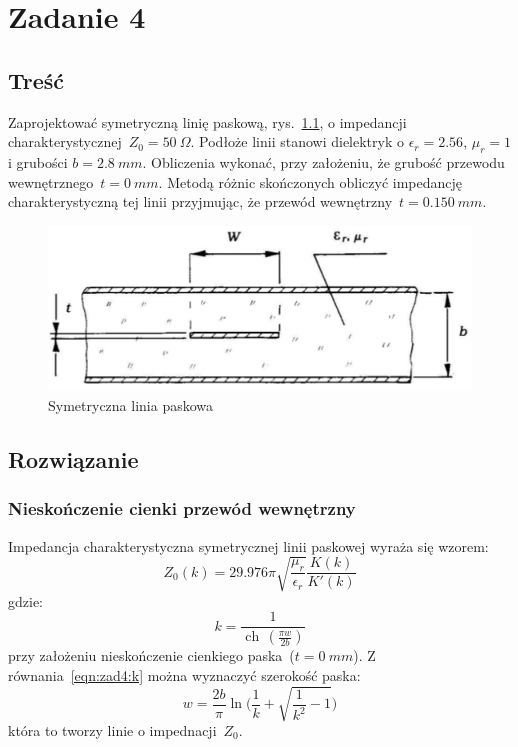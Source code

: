 \documentclass[rep.tex]{subfiles}
\begin{document}
\chapter{Zadanie 4}
\label{zad4}
\section{Treść}
Zaprojektować symetryczną linię paskową, rys.~\ref{fig:zad4:stripline},
o impedancji charakterystycznej~$Z_0 = 50~\Omega$.
Podłoże linii stanowi dielektryk o $\epsilon_r = 2.56$, $\mu_r = 1$ i grubości $b = 2.8~mm$.
Obliczenia wykonać, przy założeniu, że grubość przewodu wewnętrznego~$t = 0~mm$.
Metodą różnic skończonych obliczyć impedancję charakterystyczną tej linii przyjmując,
że przewód wewnętrzny~$t = 0.150~mm$.

\begin{figure}[!htbp]
  \centering
  \includegraphics[scale=0.5]{fig/zad4/stripline}
  \caption{Symetryczna linia paskowa}
  \label{fig:zad4:stripline}
\end{figure}

\section{Rozwiązanie}
\subsection{Nieskończenie cienki przewód wewnętrzny}
Impedancja charakterystyczna symetrycznej linii paskowej wyraża się wzorem:
\begin{equation}
  Z_0(k) = 29.976 \pi \sqrt{\frac{\mu_r}{\epsilon_r}} \frac{K(k)}{K'(k)} \label{eqn:zad4:z}
\end{equation}
gdzie:
\begin{equation}
  k = \frac{1}{\operatorname{ch}\,(\frac{\pi w}{2b})} \label{eqn:zad4:k}
\end{equation}
przy założeniu nieskończenie cienkiego paska~($t = 0~mm$).
Z równania~\ref{eqn:zad4:k} można wyznaczyć szerokość paska:
\begin{equation}
  w = \frac{2b}{\pi} \ln\big(\frac{1}{k} + \sqrt{\frac{1}{k^2} - 1}\big) \label{eqn:zad4:w}
\end{equation}
która to tworzy linie o impednacji~$Z_0$.
\end{document}
